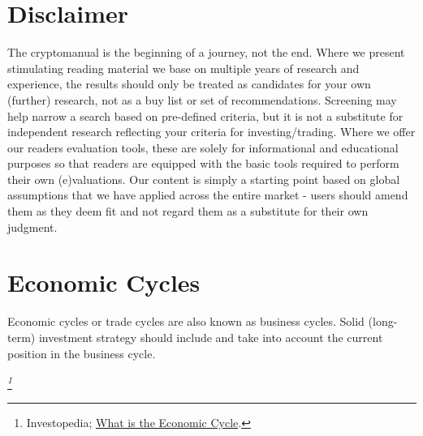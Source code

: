 \section{Disclaimer}
The cryptomanual is the beginning of a journey, not the end. Where we present stimulating reading material we base on multiple years of research and experience, the results should only be treated as candidates for your own (further) research, not as a buy list or set of recommendations. Screening may help narrow a search based on pre-defined criteria, but it is not a substitute for independent research reflecting your criteria for investing/trading. Where we offer our readers evaluation tools, these are solely for informational and educational purposes so that readers are equipped with the basic tools required to perform their own (e)valuations. Our content is simply a starting point based on global assumptions that we have applied across the entire market - users should amend them as they deem fit and not regard them as a substitute for their own judgment.

\section{Economic Cycles}
Economic cycles or trade cycles are also known as business cycles. Solid (long-term) investment strategy should include and take into account the current position in the business cycle. 

    \medskip
    \begin{tcolorbox}
    [enhanced,
    title=Economic cycles explained,
    frame style=
    {left color=orange!85!black,right color=yellow!95!black}]
        \textit{ \footnote{Investopedia; \href{https://www.investopedia.com/terms/e/economic-cycle.asp}{What is the Economic Cycle}.}}
    \end{tcolorbox}

       
